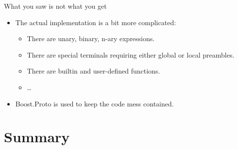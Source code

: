 \documentclass[@BEAMER_OPTIONS@]{beamer}
\begin{document}
\note{ }

\begin{frame}[fragile]{What you saw is not what you get}
    \begin{itemize}
        \item The actual implementation is a bit more complicated:
            \begin{itemize}
                \item There are unary, binary, n-ary expressions.
                \item There are special terminals requiring either global or
                    local preambles.
                \item There are builtin and user-defined functions.
                \item \ldots
            \end{itemize}
        \item Boost.Proto is used to keep the code mess contained.
    \end{itemize}
\end{frame}


\section{Summary}
\end{document}
